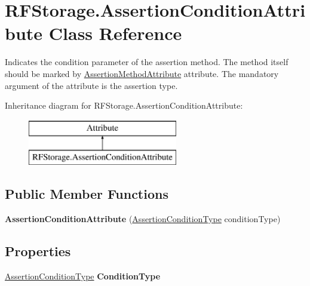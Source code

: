 \hypertarget{class_r_f_storage_1_1_assertion_condition_attribute}{}\section{R\+F\+Storage.\+Assertion\+Condition\+Attribute Class Reference}
\label{class_r_f_storage_1_1_assertion_condition_attribute}


Indicates the condition parameter of the assertion method. The method itself should be marked by \mbox{\hyperlink{class_r_f_storage_1_1_assertion_method_attribute}{Assertion\+Method\+Attribute}} attribute. The mandatory argument of the attribute is the assertion type.  


Inheritance diagram for R\+F\+Storage.\+Assertion\+Condition\+Attribute\+:\begin{figure}[H]
\begin{center}
\leavevmode
\includegraphics[height=2.000000cm]{class_r_f_storage_1_1_assertion_condition_attribute}
\end{center}
\end{figure}
\subsection*{Public Member Functions}
\begin{DoxyCompactItemize}
\item 
\mbox{\label{class_r_f_storage_1_1_assertion_condition_attribute_a6dcdcf3c1d01194bb8fad7f5b86ff69a}} 
{\bfseries Assertion\+Condition\+Attribute} (\mbox{\hyperlink{namespace_r_f_storage_adc57200f58df721ce95677742004e92a}{Assertion\+Condition\+Type}} condition\+Type)
\end{DoxyCompactItemize}
\subsection*{Properties}
\begin{DoxyCompactItemize}
\item 
\mbox{\label{class_r_f_storage_1_1_assertion_condition_attribute_ad2df0164347978f0df41307c349cfb11}} 
\mbox{\hyperlink{namespace_r_f_storage_adc57200f58df721ce95677742004e92a}{Assertion\+Condition\+Type}} {\bfseries Condition\+Type}
\end{DoxyCompactItemize}


